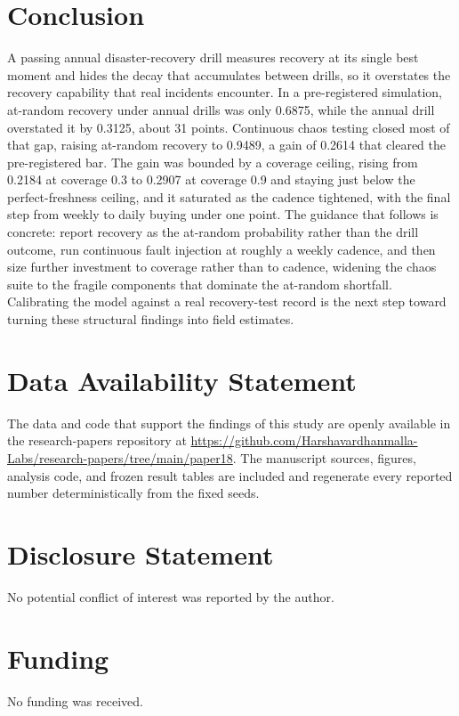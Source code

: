 \documentclass[journal]{IEEEtran}
\begin{document}
\section{Conclusion}
A passing annual disaster-recovery drill measures recovery at its single best moment and hides the
decay that accumulates between drills, so it overstates the recovery capability that real incidents
encounter. In a pre-registered simulation, at-random recovery under annual drills was only 0.6875,
while the annual drill overstated it by 0.3125, about 31 points. Continuous chaos testing closed most
of that gap, raising at-random recovery to 0.9489, a gain of 0.2614 that cleared the pre-registered
bar. The gain was bounded by a coverage ceiling, rising from 0.2184 at coverage 0.3 to 0.2907 at
coverage 0.9 and staying just below the perfect-freshness ceiling, and it saturated as the cadence
tightened, with the final step from weekly to daily buying under one point. The guidance that follows
is concrete: report recovery as the at-random probability rather than the drill outcome, run
continuous fault injection at roughly a weekly cadence, and then size further investment to coverage
rather than to cadence, widening the chaos suite to the fragile components that dominate the
at-random shortfall. Calibrating the model against a real recovery-test record is the next step
toward turning these structural findings into field estimates.

\section*{Data Availability Statement}
The data and code that support the findings of this study are openly available in the research-papers repository at \url{https://github.com/Harshavardhanmalla-Labs/research-papers/tree/main/paper18}. The manuscript sources, figures, analysis code, and frozen result tables are included and regenerate every reported number deterministically from the fixed seeds.

\section*{Disclosure Statement}
No potential conflict of interest was reported by the author.

\section*{Funding}
No funding was received.
\end{document}
